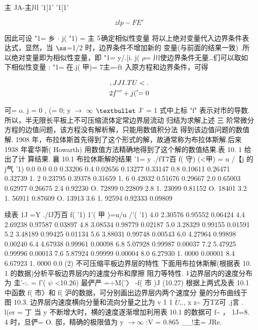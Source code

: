 主 JA-主川 '1[1' '1[1'

\[zl p-FE'\]

因此可设 "1= 乡 $\cdot $ j( "1) = 主 ${\rm 5}$确定相似性变量 将以上绝对变量代入边界条件表达式，显然，当 ${\rm ß}$=1/2 时，边界条件不增加新的 变量(与前面的结果一致) .所以绝对变量即为相似性变量，即 "1= y/.[i. j( $\rho$= 川使边界条件无量…们可以取如下相似性变量 : "1= 在.j( 甲)= 7主=-ft 入原方程和边界条件，可得

\begin{gather*}
,JJI.T U <.\\
2f"'+ j(' = 0
\end{gather*}

可= o. j = 0 , (= 0; y $\rightarrow$ $\infty$ ${\rm •}$ J' = 1 式中上标 "f" 表示对市的导数.所以，半无限长平板上不可压缩流体定常边界层流动 归结为求解上述 三 阶常微分方程的边值问题，该方程没有解析解，只能用数值积分法 得到该边值问题的数值解. 1908 年，布拉体斯首先得到了这个形式的解，故通常称为布拉体斯解.后来 1938 年霍华斯( Howarth) 用数值方法精确地得到了这个解的数值结果.表 10. 1 给出了计 算结果. 襄 10.1 布拉休斯解的结果 '1= y ./fT7百 f( 守) (<甲) = u /【j 的 j气 '1) 0.0 0.0 0.0 0.33206 0.4 0.02656 0.13277 0.33147 0.8 0.10611 0.26471 0.32739 1. 2 0.23795 0.39378 0.31659 1. 6 0.42032 0.51676 0.29667 2.0 0.65003 0.62977 0.26675 2.4 0.92230 O. 72899 0.22809 2.8 1. 23099 0.81152 O. 18401 3.2 1. 56911 0.87609 O. 13913 3.6 1. 92594 0.92333 0.09809

续表 1J =Y ./fJ万百 f( '1) 1'( 甲 )=u/u /'( '1) 4.0 2.30576 0.95552 0.06424 4.4 2.69238 0.97587 0.03897 4.8 3.08534 0.98779 0.02187 5.0 3.28329 0.99155 0.01591 5.2 3.48189 0.99425 0.01134 5.6 3.88031 0.99748 0.00543 6.0 4.27964 0.99898 0.00240 6.4 4.67938 0.99961 0.00098 6.8 5.07928 0.99987 0.00037 7.2 5.47925 0.99996 0.00013 7.6 5.87924 0.99999 0.00004 8.0 6.27930 1. 0000 0.00001 8.4 6.67923 1. 0000 0.0 (2) 不可压缩平板边界层的特性 下面用布拉休斯解(根据表 10. 1 的数据)分析平板边界层内的速度分布和摩擦 阻力等特性. ${\rm 1}$边界层内的速度分布为 圭'-:. = f'( $\psi$ <10.26) 最俨严 =$\div$M('〉 -f( 市 )J (10.27) 根据上两式及表 10.1 中函数 f( 市〉和 f( 沪的数据，可分别画出边界层内两个速度分 量的分布曲线于图 10.3. 边界层内速度横向分量和流向分量之比为 v 1 1 $\tilde{U}$,., x z\textasciitilde{} 万TZ可 .j言 . l(er = 丁 当 y 不断增大时，横的速度逐渐增加利用表 10.1 的数据可 f\textasciitilde{} ， 1J=8. 4 时，旦俨= O. 邸，精确的极限值为 y $\rightarrow$$\infty$ :V = 0.865 \_\_!主= JRe.


